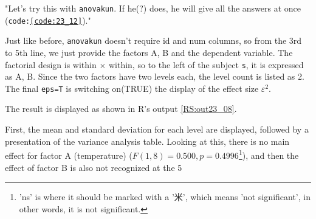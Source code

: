 \documentclass{ltjbook}
\begin{document}
"Let's try this with \texttt{anovakun}. If he(?) does, he will give all the answers at once (\texttt{code:\ref{code:23_12}})."

Just like before, \texttt{anovakun} doesn't require id and num columns, so from the 3rd to 5th line, we just provide the factors A, B and the dependent variable. The factorial design is within $\times$ within, so to the left of the subject \texttt{s}, it is expressed as A, B. Since the two factors have two levels each, the level count is listed as 2. The final \texttt{eps=T} is switching on(TRUE) the display of the effect size $\varepsilon^2$.

The result is displayed as shown in R's output \ref{RS:out23_08}.


First, the mean and standard deviation for each level are displayed, followed by a presentation of the variance analysis table.
Looking at this, there is no main effect for factor A (temperature) ($F(1,8)=0.500,p=0.4996$\footnote{'ns' is where it should be marked with a '米', which means 'not significant', in other words, it is not significant.}), and then the effect of factor B is also not recognized at the 5%
\end{document}
